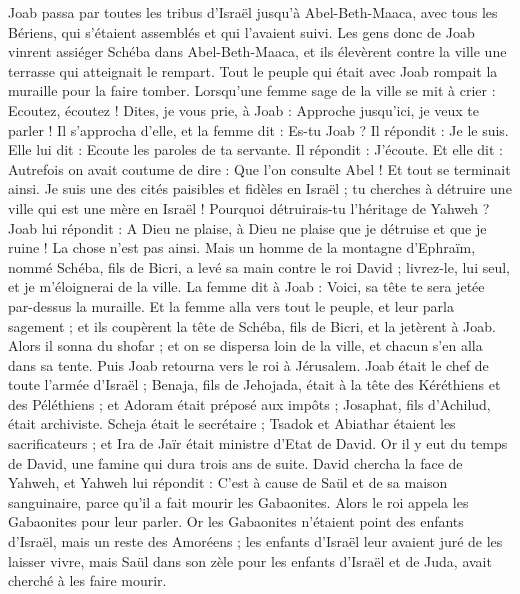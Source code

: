 \begin{multicols}{2}
Joab passa par toutes les tribus d'Israël jusqu'à Abel-Beth-Maaca, avec tous les Bériens, qui s'étaient assemblés et qui l'avaient suivi.
Les gens donc de Joab vinrent assiéger Schéba dans Abel-Beth-Maaca, et ils élevèrent contre la ville une terrasse qui atteignait le rempart. Tout le peuple qui était avec Joab rompait la muraille pour la faire tomber.
Lorsqu'une femme sage de la ville se mit à crier : Ecoutez, écoutez ! Dites, je vous prie, à Joab : Approche jusqu'ici, je veux te parler !
Il s'approcha d'elle, et la femme dit : Es-tu Joab ? Il répondit : Je le suis. Elle lui dit : Ecoute les paroles de ta servante. Il répondit : J'écoute.
Et elle dit : Autrefois on avait coutume de dire : Que l'on consulte Abel ! Et tout se terminait ainsi.
Je suis une des cités paisibles et fidèles en Israël ; tu cherches à détruire une ville qui est une mère en Israël ! Pourquoi détruirais-tu l'héritage de Yahweh ?
Joab lui répondit : A Dieu ne plaise, à Dieu ne plaise que je détruise et que je ruine !
La chose n'est pas ainsi. Mais un homme de la montagne d'Ephraïm, nommé Schéba, fils de Bicri, a levé sa main contre le roi David ; livrez-le, lui seul, et je m'éloignerai de la ville. La femme dit à Joab : Voici, sa tête te sera jetée par-dessus la muraille.
Et la femme alla vers tout le peuple, et leur parla sagement ; et ils coupèrent la tête de Schéba, fils de Bicri, et la jetèrent à Joab. Alors il sonna du shofar ; et on se dispersa loin de la ville, et chacun s'en alla dans sa tente. Puis Joab retourna vers le roi à Jérusalem.
Joab était le chef de toute l'armée d'Israël ; Benaja, fils de Jehojada, était à la tête des Kéréthiens et des Péléthiens ;
et Adoram était préposé aux impôts ; Josaphat, fils d'Achilud, était archiviste.
Scheja était le secrétaire ; Tsadok et Abiathar étaient les sacrificateurs ;
et Ira de Jaïr était ministre d'Etat de David.
\VerseOne{}Or il y eut du temps de David, une famine qui dura trois ans de suite. David chercha la face de Yahweh, et Yahweh lui répondit : C'est à cause de Saül et de sa maison sanguinaire, parce qu'il a fait mourir les Gabaonites.
Alors le roi appela les Gabaonites pour leur parler. Or les Gabaonites n'étaient point des enfants d'Israël, mais un reste des Amoréens ; les enfants d'Israël leur avaient juré de les laisser vivre, mais Saül dans son zèle pour les enfants d'Israël et de Juda, avait cherché à les faire mourir.

\end{multicols}
